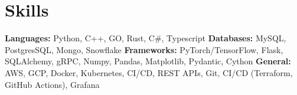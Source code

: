 \vspace{5 pt - 0.3 cm}
\section{Skills}
\begin{onecolentry}
    \textbf{Languages:} Python, C++, GO, Rust, C\#, Typescript \newline
    \textbf{Databases:} MySQL, PostgresSQL, Mongo, Snowflake \newline
    \textbf{Frameworks:} PyTorch/TensorFlow, Flask, SQLAlchemy, gRPC, Numpy, Pandas, Matplotlib, Pydantic, Cython   \newline
    \textbf{General:} AWS, GCP, Docker, Kubernetes, CI/CD, REST APIs, Git, CI/CD (Terraform, GitHub Actions), Grafana \newline
\end{onecolentry}